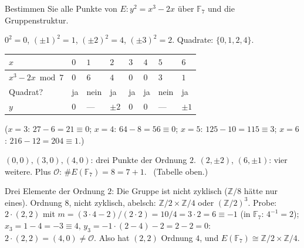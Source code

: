 \begin{aufgabe}
Bestimmen Sie alle Punkte von $E\colon y^{2} = x^{3} - 2x$ über $\mathbb F_7$ und die Gruppenstruktur.

\loesung
{}
$0^{2} = 0$, $(\pm1)^{2} = 1$, $(\pm2)^{2} = 4$, $(\pm3)^{2} = 2$. Quadrate: $\{0, 1, 2, 4\}$.

\begin{center}
{\small
\renewcommand{\arraystretch}{1.46}
\begin{tabular}{@{}P{2.0cm}P{0.7cm}P{0.7cm}P{0.7cm}P{0.7cm}P{0.7cm}P{0.7cm}P{0.7cm}@{}}
\toprule
$x$ & $0$ & $1$ & $2$ & $3$ & $4$ & $5$ & $6$\\
\midrule
$x^{3} - 2x \bmod 7$ & $0$ & $6$ & $4$ & $0$ & $0$ & $3$ & $1$\\
Quadrat? & ja & nein & ja & ja & ja & nein & ja\\
$y$ & $0$ & --- & $\pm2$ & $0$ & $0$ & --- & $\pm1$\\
\bottomrule
\end{tabular}}
\end{center}
($x = 3$: $27 - 6 = 21\equiv0$; $x = 4$: $64 - 8 = 56\equiv0$; $x = 5$: $125 - 10 = 115\equiv3$; $x = 6$: $216 - 12 = 204\equiv1$.)

$(0,0), (3,0), (4,0)$: drei Punkte der Ordnung $2$. $(2, \pm2)$, $(6, \pm1)$: vier weitere. Plus $\mathcal O$: $\#E(\mathbb F_7) = 8 = 7 + 1$. \checkmark\ (Tabelle oben.)

Drei Elemente der Ordnung $2$: Die Gruppe ist nicht zyklisch ($\mathbb Z/8$ hätte nur eines). Ordnung $8$, nicht zyklisch, abelsch: $\mathbb Z/2\times\mathbb Z/4$ oder $(\mathbb Z/2)^{3}$. Probe: $2\cdot(2, 2)$ mit $m = (3\cdot4 - 2)/(2\cdot2) = 10/4 = 3\cdot2 = 6\equiv-1$ (in $\mathbb F_7$: $4^{-1} = 2$); $x_3 = 1 - 4 = -3\equiv4$, $y_3 = -1\cdot(2 - 4) - 2 = 2 - 2 = 0$: $2\cdot(2,2) = (4, 0)\ne\mathcal O$. Also hat $(2, 2)$ Ordnung $4$, und $E(\mathbb F_7)\cong\mathbb Z/2\times\mathbb Z/4$.

\begin{center}
\begin{minipage}{0.88\textwidth}
\end{minipage}
\end{center}
\end{aufgabe}

